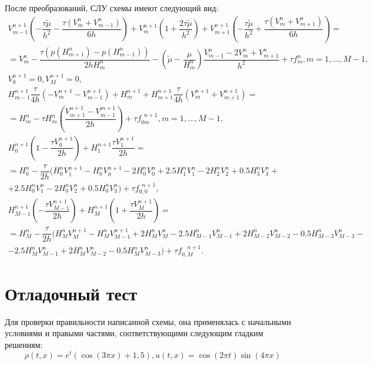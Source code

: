 \documentclass[12pt,a4paper]{article}
\begin{document}
После преобразований, СЛУ схемы имеют следующий вид:
\begin{gather*}
    V_{m-1}^{n+1}\left(-\dfrac{\tau\tilde{\mu}}{h^2}-\dfrac{\tau(V_{m}^n + V_{m-1}^n)}{6h}\right) + 
    V_{m}^{n+1}\left(1+\dfrac{2\tau\tilde{\mu}}{h^2}\right) +
    V_{m+1}^{n+1}\left(-\dfrac{\tau\tilde{\mu}}{h^2}+\dfrac{\tau(V_{m}^{n} + V_{m+1}^{n})}{6h} \right)= \\ =
    V_{m}^n-\dfrac{\tau(p(H_{m+1}^{n}) - p(H_{m-1}^n))}{2hH_m^n} -
    \left( \tilde{\mu} - \dfrac{\mu}{H_m^n} \right) \dfrac{V_{m-1}^n - 2V_{m}^n + V_{m+1}^n}{h^2} + \tau f_m^{n}
    , m = 1,\dots, M-1,\\
    V_0^{n+1} = 0, V_M^{n+1} = 0, \\
    H_{m-1}^{n+1}\dfrac{\tau}{4h}(-V_{m}^{n+1} - V_{m-1}^{n+1}) +
    H_{m}^{n+1} +
    H_{m+1}^{n+1}\dfrac{\tau}{4h}(V_{m}^{n+1} + V_{m+1}^{n+1}) = \\
    = H_{m}^{n} - \tau H_{m}^{n}\left( \dfrac{V_{m+1}^{n+1} - V_{m-1}^{m+1}}{2h} \right) + \tau f_{0m}^{\phantom{0}n+1}
    , m = 1,\dots, M-1,\\
    H_0^{n+1}\left( 1 - \dfrac{\tau V_0^{n+1}}{2h} \right) + H_1^{n+1}\dfrac{\tau V_1^{n+1}}{2h} = \\
    = H_0^{n} - \dfrac{\tau}{2h}(H_0^nV_1^{n+1} - H_0^nV_0^{n+1} - 2H_0^nV_0^n + 2.5H_1^nV_1^n - 2H_2^nV_2^n + 0.5H_3^nV_3^n + \\
    + 2.5H_0^nV_1^n - 2H_0^nV_2^n + 0.5H_0^nV_3^n) + \tau f_{0,0}^{\phantom{0}n+1}, \\
    H_{M-1}^{n+1}\left(-\dfrac{\tau V_{M-1}^{n+1}}{2h}\right) + H_M^{n+1}\left(1 + \dfrac{\tau V_M^{n+1}}{2h}\right) = \\
    = H_M^{n} - \dfrac{\tau}{2h}(H_M^nV_M^{n+1} - H_M^nV_{M-1}^{n+1} + 2H_M^nV_M^n - 2.5H_{M-1}^nV_{M-1}^n + 2H_{M-2}^nV_{M-2}^n - 0.5H_{M-3}^nV_{M-3}^n - \\
    - 2.5H_M^nV_{M-1}^n + 2H_M^nV_{M-2}^n - 0.5H_M^nV_{M-3}^n) + \tau f_{0,M}^{\phantom{0,}n+1}.
\end{gather*}

\section{Отладочный тест}

Для проверки правильности написанной схемы, она применялась с начальными условиями и правыми частями, соответствующими следующим гладким решениям:
\begin{equation*}
    \rho(t, x) = e^t(\cos(3\pi x) + 1,\!5), u(t, x) = \cos(2\pi t)\sin(4\pi x)
\end{equation*}
\end{document}
